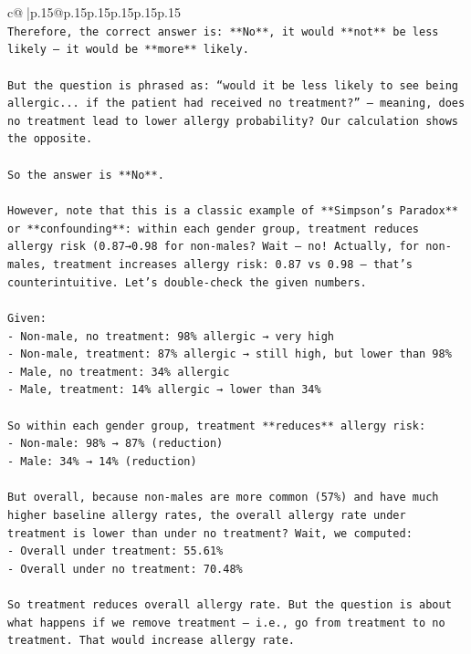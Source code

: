 \documentclass{article}
\begin{document}
{\begin{supertabular}{c@{$\;$}|p{.15\linewidth}@{}p{.15\linewidth}p{.15\linewidth}p{.15\linewidth}p{.15\linewidth}p{.15\linewidth}}
{{{\\ 
\texttt{Therefore, the correct answer is: **No**, it would **not** be less likely — it would be **more** likely.} \\
\\ 
\texttt{But the question is phrased as: “would it be less likely to see being allergic... if the patient had received no treatment?” — meaning, does no treatment lead to lower allergy probability? Our calculation shows the opposite.} \\
\\ 
\texttt{So the answer is **No**.} \\
\\ 
\texttt{However, note that this is a classic example of **Simpson’s Paradox** or **confounding**: within each gender group, treatment reduces allergy risk (0.87→0.98 for non{-}males? Wait — no! Actually, for non{-}males, treatment increases allergy risk: 0.87 vs 0.98 — that’s counterintuitive. Let’s double{-}check the given numbers.} \\
\\ 
\texttt{Given:} \\
\texttt{{-} Non{-}male, no treatment: 98\% allergic → very high} \\
\texttt{{-} Non{-}male, treatment: 87\% allergic → still high, but lower than 98\%} \\
\texttt{{-} Male, no treatment: 34\% allergic} \\
\texttt{{-} Male, treatment: 14\% allergic → lower than 34\%} \\
\\ 
\texttt{So within each gender group, treatment **reduces** allergy risk:} \\
\texttt{{-} Non{-}male: 98\% → 87\% (reduction)} \\
\texttt{{-} Male: 34\% → 14\% (reduction)} \\
\\ 
\texttt{But overall, because non{-}males are more common (57\%) and have much higher baseline allergy rates, the overall allergy rate under treatment is lower than under no treatment? Wait, we computed:} \\
\texttt{{-} Overall under treatment: 55.61\%} \\
\texttt{{-} Overall under no treatment: 70.48\%} \\
\\ 
\texttt{So treatment reduces overall allergy rate. But the question is about what happens if we remove treatment — i.e., go from treatment to no treatment. That would increase allergy rate.} \\
}}}
\end{supertabular}}
\end{document}
